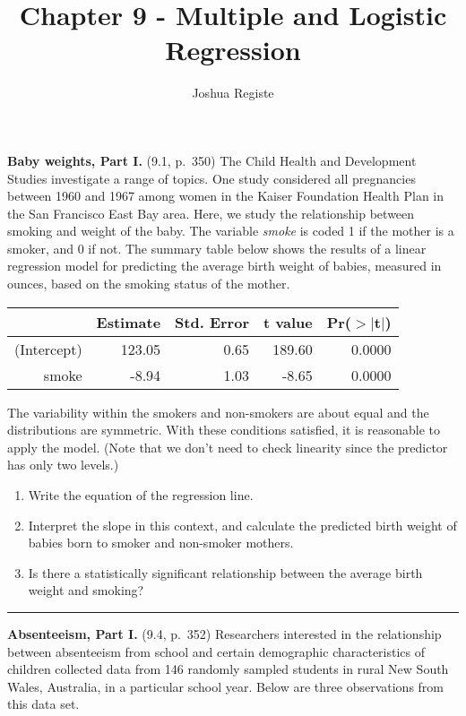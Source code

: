 \documentclass[
]{article}
\title{Chapter 9 - Multiple and Logistic Regression}
\author{Joshua Registe}
\date{}
\providecommand{\tightlist}{%
  \setlength{\itemsep}{0pt}\setlength{\parskip}{0pt}}
\begin{document}
\maketitle

\textbf{Baby weights, Part I.} (9.1, p.~350) The Child Health and
Development Studies investigate a range of topics. One study considered
all pregnancies between 1960 and 1967 among women in the Kaiser
Foundation Health Plan in the San Francisco East Bay area. Here, we
study the relationship between smoking and weight of the baby. The
variable \emph{smoke} is coded 1 if the mother is a smoker, and 0 if
not. The summary table below shows the results of a linear regression
model for predicting the average birth weight of babies, measured in
ounces, based on the smoking status of the mother.

\begin{center}
\begin{tabular}{rrrrr}
  \hline
            & Estimate  & Std. Error  & t value   & Pr($>$$|$t$|$) \\ 
  \hline
(Intercept) & 123.05    & 0.65        & 189.60    & 0.0000 \\ 
smoke       & -8.94     & 1.03        & -8.65     & 0.0000 \\ 
  \hline
\end{tabular}
\end{center}

The variability within the smokers and non-smokers are about equal and
the distributions are symmetric. With these conditions satisfied, it is
reasonable to apply the model. (Note that we don't need to check
linearity since the predictor has only two levels.)

\begin{enumerate}
\def\labelenumi{(\alph{enumi})}
\tightlist
\item
  Write the equation of the regression line.
\item
  Interpret the slope in this context, and calculate the predicted birth
  weight of babies born to smoker and non-smoker mothers.
\item
  Is there a statistically significant relationship between the average
  birth weight and smoking?
\end{enumerate}

\begin{center}\rule{0.5\linewidth}{0.5pt}\end{center}

\clearpage

\textbf{Absenteeism, Part I.} (9.4, p.~352) Researchers interested in
the relationship between absenteeism from school and certain demographic
characteristics of children collected data from 146 randomly sampled
students in rural New South Wales, Australia, in a particular school
year. Below are three observations from this data set.
\end{document}
